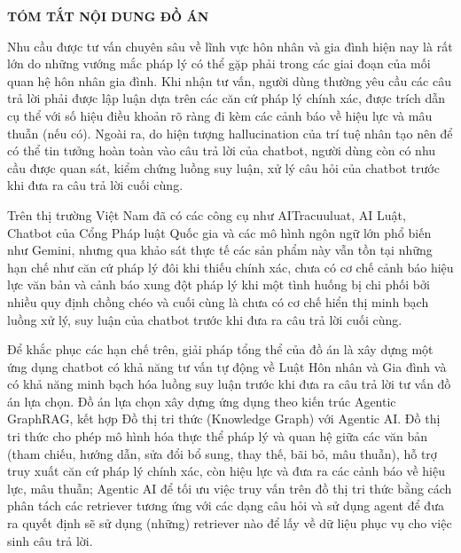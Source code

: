 \documentclass[../DoAn.tex]{subfiles}
\begin{document}
\begin{center}
    \Large{\textbf{TÓM TẮT NỘI DUNG ĐỒ ÁN}}\\
\end{center}
\vspace{0.5cm}


Nhu cầu được tư vấn chuyên sâu về lĩnh vực hôn nhân và gia đình hiện nay là rất lớn do những vướng mắc pháp lý có thể gặp phải trong các giai đoạn của mối quan hệ hôn nhân gia đình. Khi nhận tư vấn, người dùng thường yêu cầu các câu trả lời phải được lập luận dựa trên các căn cứ pháp lý chính xác, được trích dẫn cụ thể với số hiệu điều khoản rõ ràng đi kèm các cảnh báo về hiệu lực và mâu thuẫn (nếu có). Ngoài ra, do hiện tượng hallucination của trí tuệ nhân tạo nên để có thể tin tưởng hoàn toàn vào câu trả lời của chatbot, người dùng còn có nhu cầu được quan sát, kiểm chứng luồng suy luận, xử lý câu hỏi của chatbot trước khi đưa ra câu trả lời cuối cùng.


Trên thị trường Việt Nam đã có các công cụ như AITracuuluat, AI Luật, Chatbot của Cổng Pháp luật Quốc gia và các mô hình ngôn ngữ lớn phổ biến như Gemini, nhưng qua khảo sát thực tế các sản phẩm này vẫn tồn tại những hạn chế như căn cứ pháp lý đôi khi thiếu chính xác, chưa có cơ chế cảnh báo hiệu lực văn bản và cảnh báo xung đột pháp lý khi một tình huống bị chi phối bởi nhiều quy định chồng chéo và cuối cùng là chưa có cơ chế hiển thị minh bạch luồng xử lý, suy luận của chatbot trước khi đưa ra câu trả lời cuối cùng.


Để khắc phục các hạn chế trên, giải pháp tổng thể của đồ án là xây dựng một ứng dụng chatbot có khả năng tư vấn tự động về Luật Hôn nhân và Gia đình và có khả năng minh bạch hóa luồng suy luận trước khi đưa ra câu trả lời tư vấn đồ án lựa chọn. Đồ án lựa chọn xây dựng ứng dụng theo kiến trúc Agentic GraphRAG, kết hợp Đồ thị tri thức (Knowledge Graph) với Agentic AI. Đồ thị tri thức cho phép mô hình hóa thực thể pháp lý và quan hệ giữa các văn bản (tham chiếu, hướng dẫn, sửa đổi bổ sung, thay thế, bãi bỏ, mâu thuẫn), hỗ trợ truy xuất căn cứ pháp lý chính xác, còn hiệu lực và đưa ra các cảnh báo về hiệu lực, mâu thuẫn; Agentic AI để tối ưu việc truy vấn trên đồ thị tri thức bằng cách phân tách các retriever tương ứng với các dạng câu hỏi và sử dụng agent để đưa ra quyết định sẽ sử dụng (những) retriever nào để lấy về dữ liệu phục vụ cho việc sinh câu trả lời.
\end{document}
